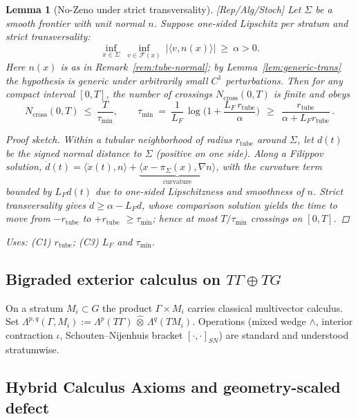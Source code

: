 \documentclass[10pt]{article}
\newcommand{\uses}[1]{\par\smallskip\noindent\textit{Uses: }#1\par\smallskip}
\newenvironment{proofsketch}{\begin{proof}[Proof sketch]}{\end{proof}}
\newtheorem{lemma}{Lemma}
\begin{document}
\begin{lemma}[No-Zeno under strict transversality]\label{lem:no-zeno}
\emph{[\textup{Rep/Alg/Stoch}]} Let $\Sigma$ be a smooth frontier with unit normal $n$. Suppose one-sided Lipschitz per stratum and strict transversality:
\[
\inf_{x\in\Sigma}\ \inf_{v\in \mathcal F(x)}\ |\langle v,n(x)\rangle|\ \ge\ \alpha>0.
\]
Here $n(x)$ is as in Remark~\ref{rem:tube-normal}; by Lemma~\ref{lem:generic-trans} the hypothesis is generic under arbitrarily small $C^1$ perturbations. Then for any compact interval $[0,T]$, the number of crossings $N_{\mathrm{cross}}(0,T)$ is finite and obeys
\[
N_{\mathrm{cross}}(0,T)\ \le\ \frac{T}{\tau_{\min}},\qquad
\tau_{\min}\ =\ \frac{1}{L_F}\,\log\!\Big(1+\frac{L_F\,r_{\mathrm{tube}}}{\alpha}\Big)\ \ \ge\ \ \frac{r_{\mathrm{tube}}}{\alpha+L_F r_{\mathrm{tube}}}\,.
\]
\begin{proofsketch}
Within a tubular neighborhood of radius $r_{\mathrm{tube}}$ around $\Sigma$, let $d(t)$ be the signed normal distance to $\Sigma$ (positive on one side). Along a Filippov solution, $\dot d(t)=\langle \dot x(t),n\rangle+\underbrace{\langle x-\pi_\Sigma(x),\nabla n\rangle}_{\text{curvature}}$, with the curvature term bounded by $L_F d(t)$ due to one-sided Lipschitzness and smoothness of $n$. Strict transversality gives $\dot d\ge \alpha - L_F d$, whose comparison solution yields the time to move from $-r_{\mathrm{tube}}$ to $+r_{\mathrm{tube}}$ $\ge \tau_{\min}$; hence at most $T/\tau_{\min}$ crossings on $[0,T]$.
\end{proofsketch}
\uses{(C1) $r_{\mathrm{tube}}$; (C3) $L_F$ and $\tau_{\min}$.}
\end{lemma}

\subsection{Bigraded exterior calculus on $T\Gamma\oplus TG$}

On a stratum $M_i\subset G$ the product $\Gamma\times M_i$ carries classical multivector calculus. Set
$\Lambda^{p,q}(\Gamma,M_i):=\Lambda^p(T\Gamma)\,\hat\otimes\,\Lambda^q(TM_i)$. Operations (mixed wedge $\wedge$, interior contraction $\iota$, Schouten–Nijenhuis bracket $[\cdot,\cdot]_{SN}$) are standard and understood stratumwise.

\subsection{Hybrid Calculus Axioms and geometry-scaled defect}\label{subsec:hybrid-axioms}
\end{document}
